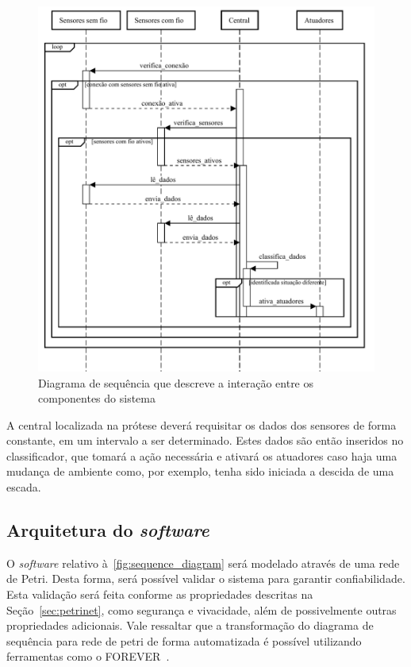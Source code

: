 \begin{figure}[ht]
	\caption{\label{fig:sequence_diagram}Diagrama de sequência que descreve a interação entre os componentes do sistema}
	\begin{center}
	    \includegraphics[width=\textwidth]{resources/sequence_diagram.pdf}
	\end{center}
\end{figure}

A central localizada na prótese deverá requisitar os dados dos sensores de forma constante, em um intervalo a ser determinado. Estes dados são então inseridos no classificador, que tomará a ação necessária e ativará os atuadores caso haja uma mudança de ambiente como, por exemplo, tenha sido iniciada a descida de uma escada.

\subsection{Arquitetura do \textit{software}}\label{sec:metodo_prot_software}
O \textit{software} relativo à~\autoref{fig:sequence_diagram} será modelado através de uma rede de Petri. Desta forma, será possível validar o sistema para garantir confiabilidade. Esta validação será feita conforme as propriedades descritas na Seção~\ref{sec:petrinet}, como segurança e vivacidade, além de possivelmente outras propriedades adicionais. 
% 
Vale ressaltar que a transformação do diagrama de sequência para rede de petri de forma automatizada é possível utilizando ferramentas como o FOREVER~\cite{cunha:2011forever}.

